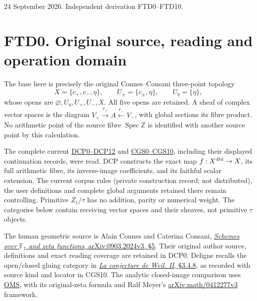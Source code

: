 24 September 2026. Independent derivation FTD0--FTD10.

\section{FTD0. Original source, reading and operation
domain}\label{ftd0.-original-source-reading-and-operation-domain}

The base here is precisely the original Connes--Consani three-point
topology \[
X=\{c_+,c_-,\eta\},\qquad
U_\pm=\{c_\pm,\eta\},\qquad U_\eta=\{\eta\},
\] whose opens are \(\varnothing,U_\eta,U_+,U_-,X\). All five opens are
retained. A sheaf of complex vector spaces is the diagram
\(V_+\xrightarrow{r_+}A\xleftarrow{r_-}V_-\), with global sections its
fibre product. No arithmetic point of the source fibre
\(\operatorname{Spec}\mathbb Z\) is identified with another source point
by this calculation.

The complete current
\href{https://github.com/KokunoYumeto/zeta-function-research-reader/blob/36a82ecca98addb8a98b48204e349737856c7223/workbenches/splitzero-tandem/continuations/20260924-cohomology-weight-and-character-lifts/original-character-lifting/tau_lifting_weights_20260924/SOURCE_CC_DOUBLE_PULLBACK.md}{DCP0--DCP12}
and
\href{https://github.com/KokunoYumeto/zeta-function-research-reader/blob/36a82ecca98addb8a98b48204e349737856c7223/workbenches/splitzero-tandem/continuations/20260924-cohomology-weight-and-character-lifts/original-character-lifting/tau_lifting_weights_20260924/SOURCE_COEFFICIENT_GLUE.md}{CGS0--CGS10},
including their displayed continuation records, were read. DCP
constructs the exact map \(f:X^{\rm dbl}\to X\), its full arithmetic
fibre, its inverse-image coefficients, and its faithful scalar
extension. The current corpus rules (private construction record; not
distributed), the user definitions and complete global arguments
retained there remain controlling. Primitive \(Z_1/\tau\) has no
addition, parity or numerical weight. The categories below contain
receiving vector spaces and their sheaves, not primitive \(\tau\)
objects.

The human geometric source is Alain Connes and Caterina Consani,
\href{https://arxiv.org/abs/0903.2024v3}{\emph{Schemes over
\(\mathbb F_1\) and zeta functions}, arXiv:0903.2024v3, §5}. Their
original author source, definitions and exact reading coverage are
retained in DCP0. Deligne recalls the open/closed gluing category in
\href{https://www.numdam.org/item/PMIHES_1980__52__137_0/}{\emph{La
conjecture de Weil. II}, §3.4.8}, as recorded with source kind and
locator in CGS10. The analytic closed-image comparison uses
\href{https://github.com/KokunoYumeto/zeta-function-research-reader/blob/36a82ecca98addb8a98b48204e349737856c7223/workbenches/splitzero-tandem/continuations/20260924-cohomology-weight-and-character-lifts/original-character-lifting/tau_lifting_weights_20260924/ORIGINAL_MELLIN_SPECTRAL_SYNTHESIS.md}{OMS},
with its original-zeta formula and Ralf Meyer's
\href{https://arxiv.org/abs/math/0412277v3}{arXiv:math/0412277v3}
framework.

